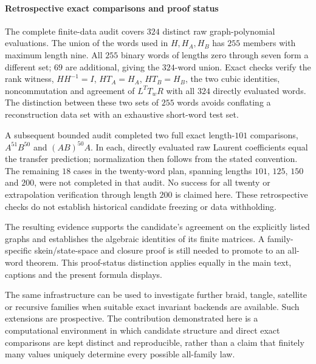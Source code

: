\documentclass[10pt,twocolumn]{article}
\begin{document}
\paragraph{Retrospective exact comparisons and proof status}
\label{supp:transfer_nonabelian_verification}
The complete finite-data audit covers $324$ distinct raw graph-polynomial evaluations. The union of the words used in $H,H_A,H_B$ has $255$ members with maximum length nine. All $255$ binary words of lengths zero through seven form a different set; $69$ are additional, giving the $324$-word union. Exact checks verify the rank witness, $HH^{-1}=I$, $HT_A=H_A$, $HT_B=H_B$, the two cubic identities, noncommutation and agreement of $L^TT_wR$ with all $324$ directly evaluated words. The distinction between these two sets of $255$ words avoids conflating a reconstruction data set with an exhaustive short-word test set.

A subsequent bounded audit completed two full exact length-$101$ comparisons, $A^{51}B^{50}$ and $(AB)^{50}A$. In each, directly evaluated raw Laurent coefficients equal the transfer prediction; normalization then follows from the stated convention. The remaining $18$ cases in the twenty-word plan, spanning lengths $101$, $125$, $150$ and $200$, were not completed in that audit. No success for all twenty or extrapolation verification through length $200$ is claimed here. These retrospective checks do not establish historical candidate freezing or data withholding.

The resulting evidence supports the candidate's agreement on the explicitly listed graphs and establishes the algebraic identities of its finite matrices. A family-specific skein/state-space and closure proof is still needed to promote  to an all-word theorem. This proof-status distinction applies equally in the main text, captions and the present formula displays.

The same infrastructure can be used to investigate further braid, tangle, satellite or recursive families when suitable exact invariant backends are available. Such extensions are prospective. The contribution demonstrated here is a computational environment in which candidate structure and direct exact comparisons are kept distinct and reproducible, rather than a claim that finitely many values uniquely determine every possible all-family law.
\end{document}

